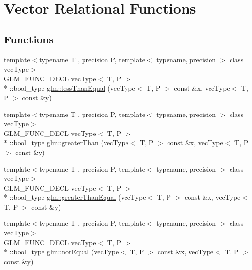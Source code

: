 \hypertarget{group__core__func__vector__relational}{\section{Vector Relational Functions}
\label{group__core__func__vector__relational}
}
\subsection*{Functions}
\begin{DoxyCompactItemize}
\item 
{\footnotesize template$<$typename T , precision P, template$<$ typename, precision $>$ class vec\-Type$>$ }\\G\-L\-M\-\_\-\-F\-U\-N\-C\-\_\-\-D\-E\-C\-L vec\-Type$<$ T, P $>$\\*
\-::bool\-\_\-type \hyperlink{group__core__func__vector__relational_ga2167b22ac086c5791a4740932b62b685}{glm\-::less\-Than\-Equal} (vec\-Type$<$ T, P $>$ const \&x, vec\-Type$<$ T, P $>$ const \&y)
\item 
{\footnotesize template$<$typename T , precision P, template$<$ typename, precision $>$ class vec\-Type$>$ }\\G\-L\-M\-\_\-\-F\-U\-N\-C\-\_\-\-D\-E\-C\-L vec\-Type$<$ T, P $>$\\*
\-::bool\-\_\-type \hyperlink{group__core__func__vector__relational_gac9163d451231eb3eaae2c6b3da5add6a}{glm\-::greater\-Than} (vec\-Type$<$ T, P $>$ const \&x, vec\-Type$<$ T, P $>$ const \&y)
\item 
{\footnotesize template$<$typename T , precision P, template$<$ typename, precision $>$ class vec\-Type$>$ }\\G\-L\-M\-\_\-\-F\-U\-N\-C\-\_\-\-D\-E\-C\-L vec\-Type$<$ T, P $>$\\*
\-::bool\-\_\-type \hyperlink{group__core__func__vector__relational_gad1385064aa2fc7aaae37aa95daea9c31}{glm\-::greater\-Than\-Equal} (vec\-Type$<$ T, P $>$ const \&x, vec\-Type$<$ T, P $>$ const \&y)
\item 
{\footnotesize template$<$typename T , precision P, template$<$ typename, precision $>$ class vec\-Type$>$ }\\G\-L\-M\-\_\-\-F\-U\-N\-C\-\_\-\-D\-E\-C\-L vec\-Type$<$ T, P $>$\\*
\-::bool\-\_\-type \hyperlink{group__core__func__vector__relational_ga85d7bc5613c4dcc2d5873ec9d6ed4c19}{glm\-::not\-Equal} (vec\-Type$<$ T, P $>$ const \&x, vec\-Type$<$ T, P $>$ const \&y)

\end{DoxyCompactItemize}
